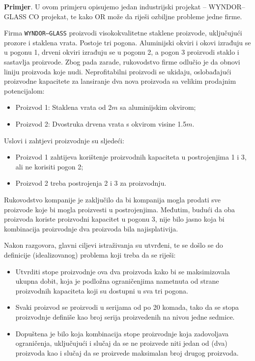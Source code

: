 \documentclass[a4paper, utf8, 11pt, colorlinks]{book}
\begin{document}
\textbf{Primjer}. U ovom primjeru opisujemo jedan industrijski projekat 
-- {WYNDOR--GLASS CO projekat}, te kako OR može da riješi ozbiljne probleme jedne firme. 
  
Firma \texttt{WYNDOR--GLASS} proizvodi visokokvalitetne staklene proizvode, uključujući prozore i staklena vrata. Postoje tri pogona. Aluminijski okviri i okovi izrađuju se u pogonu 1, drveni okviri izrađuju se u pogonu 2, a pogon 3 proizvodi staklo i sastavlja proizvode.
Zbog pada zarade, rukovodstvo firme   odlučio je da obnovi liniju proizvoda koje nudi. Neprofitabilni proizvodi se ukidaju, oslobađajući proizvodne kapacitete za lansiranje dva nova proizvoda sa velikim prodajnim potencijalom:
\begin{itemize}
    \item Proizvod 1: Staklena vrata od 2$m$ sa aluminijskim okvirom;
    \item Proizvod 2: Dvostruka drvena vrata s okvirom visine 1.5$m$.
\end{itemize}
Uslovi i zahtjevi proizvodnje su sljedeći:
\begin{itemize}
    \item Proizvod 1 zahtijeva   korištenje proizvodnih kapaciteta u postrojenjima 1 i 3, ali ne korisiti pogon 2; 
    \item Proizvod 2 treba   postrojenja 2 i 3 za proizvodnju. 
\end{itemize}
    Rukovodstvo kompanije je zaključilo da bi kompanija mogla prodati sve proizvode koje bi mogla proizvesti u postrojenjima. Međutim, budući da   oba proizvoda koriste proizvodni kapacitet u pogonu 3, nije bilo jasno koja bi kombinacija proizvodnje dva proizvoda bila najisplativija. %

Nakon razgovora, glavni ciljevi istraživanja su utvrđeni, te se došlo se do definicije (idealizovanog) problema koji treba da se riješi:
\begin{itemize}
    \item Utvrditi  stope proizvodnje  ova dva proizvoda kako bi se maksimizovala ukupna dobit, koja je podložna ograničenjima nametnuta od strane   proizvodnih kapaciteta koji su dostupni u sva tri pogona. 
    \item Svaki proizvod se proizvodi u serijama od po 20 komada, tako da se stopa proizvodnje definiše kao broj serija proizvedenih na nivou jedne sedmice. 
    \item Dopuštena je bilo koja kombinacija stope proizvodnje koja zadovoljava ograničenja, uključujući i slučaj da se ne proizvede niti jedan od (dva) proizvoda kao i slučaj da se proizvede maksimalan broj drugog proizvoda. 
\end{itemize}
\end{document}

